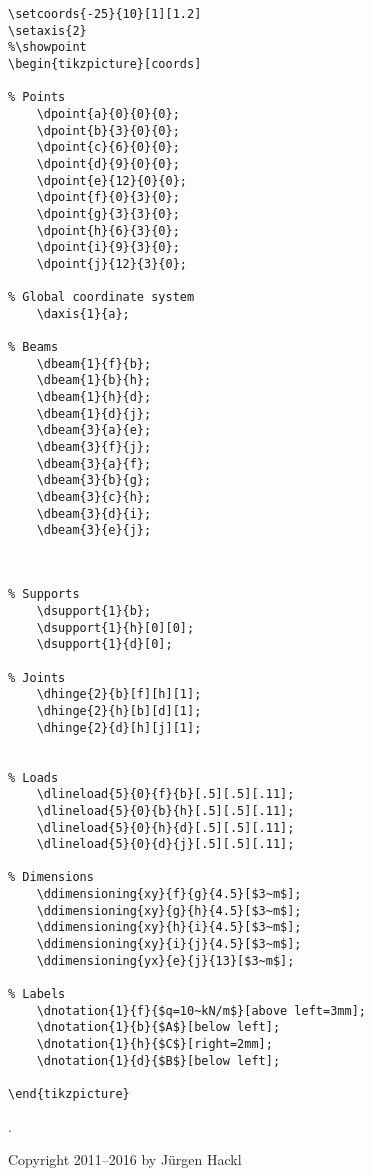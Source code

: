 \documentclass[%
  a4paper,
  BCOR20mm,
  pointlessnumbers,
  twoside,
  halfparskip,
  openright,
]{scrreprt}
\begin{document}
\begin{titlepage}
\begin{center}
\begin{minipage}[t]{0.45\linewidth}\begin{lstlisting}
\setcoords{-25}{10}[1][1.2]
\setaxis{2}
%\showpoint
\begin{tikzpicture}[coords]

% Points
	\dpoint{a}{0}{0}{0};
	\dpoint{b}{3}{0}{0};
	\dpoint{c}{6}{0}{0};
	\dpoint{d}{9}{0}{0};
	\dpoint{e}{12}{0}{0};
	\dpoint{f}{0}{3}{0};
	\dpoint{g}{3}{3}{0};
	\dpoint{h}{6}{3}{0};
	\dpoint{i}{9}{3}{0};
	\dpoint{j}{12}{3}{0};

% Global coordinate system
	\daxis{1}{a};

% Beams
	\dbeam{1}{f}{b};
	\dbeam{1}{b}{h};
	\dbeam{1}{h}{d};
	\dbeam{1}{d}{j};
	\dbeam{3}{a}{e};
	\dbeam{3}{f}{j};
	\dbeam{3}{a}{f};
	\dbeam{3}{b}{g};
	\dbeam{3}{c}{h};
	\dbeam{3}{d}{i};
	\dbeam{3}{e}{j};

	
\end{lstlisting}\vspace{-7mm}
\end{minipage}
\hfill
\begin{minipage}[t]{0.45\linewidth}\begin{lstlisting}
% Supports
	\dsupport{1}{b};
	\dsupport{1}{h}[0][0];
	\dsupport{1}{d}[0];

% Joints
	\dhinge{2}{b}[f][h][1];
	\dhinge{2}{h}[b][d][1];
	\dhinge{2}{d}[h][j][1];


% Loads
	\dlineload{5}{0}{f}{b}[.5][.5][.11];
	\dlineload{5}{0}{b}{h}[.5][.5][.11];
	\dlineload{5}{0}{h}{d}[.5][.5][.11];
	\dlineload{5}{0}{d}{j}[.5][.5][.11];

% Dimensions
	\ddimensioning{xy}{f}{g}{4.5}[$3~m$];
	\ddimensioning{xy}{g}{h}{4.5}[$3~m$];
	\ddimensioning{xy}{h}{i}{4.5}[$3~m$];
	\ddimensioning{xy}{i}{j}{4.5}[$3~m$];
	\ddimensioning{yx}{e}{j}{13}[$3~m$];

% Labels
	\dnotation{1}{f}{$q=10~kN/m$}[above left=3mm];
	\dnotation{1}{b}{$A$}[below left];
	\dnotation{1}{h}{$C$}[right=2mm];
	\dnotation{1}{d}{$B$}[below left];

\end{tikzpicture}
\end{lstlisting}\vspace{-7mm}
\end{minipage}

\end{center}
\end{titlepage}
.
\vfill

  Copyright 2011--2016 by J\"urgen Hackl
\end{document}
